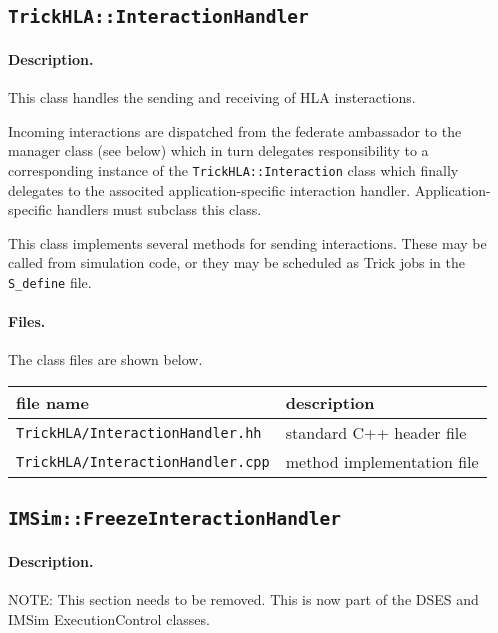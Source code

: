 \subsection{{\tt TrickHLA::InteractionHandler}}

\paragraph{Description.}
This class handles the sending and receiving of HLA insteractions.

Incoming interactions are dispatched from the federate ambassador
to the manager class (see below) which in turn delegates responsibility
to a corresponding instance of the {\tt TrickHLA::Interaction} class
which finally delegates to the associted application-specific
interaction handler.
Application-specific handlers must subclass this class.

This class implements several methods for sending interactions.  
These may be called from simulation code, or they may be scheduled as
Trick jobs in the {\tt S\_define} file.

\paragraph{Files.}
The class files are shown below.
   
{
  \scriptsize
  \begin{tabular}{|l|l|} 
    \hline
    file name & description \\
    \hline \hline
    {\tt TrickHLA/InteractionHandler.hh} 
    & standard C++ header file
    \\ \hline
    {\tt TrickHLA/InteractionHandler.cpp} 
    & method implementation file
    \\ \hline
  \end{tabular}
}

\subsection{{\tt IMSim::FreezeInteractionHandler}}

\paragraph{Description.}
NOTE: This section needs to be removed.  This is now part of the DSES and
IMSim {\ttfamily ExecutionControl} classes.

